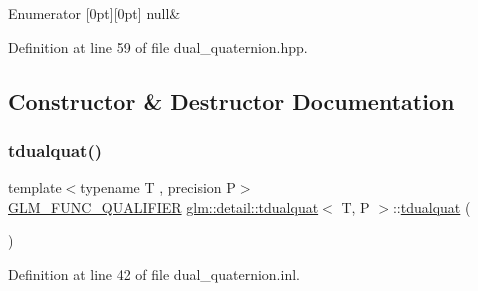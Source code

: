 \begin{DoxyEnumFields}{Enumerator}
[0pt][0pt]{}\mbox{\label{structglm_1_1detail_1_1tdualquat_ace336aab392c50d450452edacc3d7f41a9649d51893e82ea43ff08e3c5f06bdc9}} 
null&\\
\hline

\end{DoxyEnumFields}


Definition at line 59 of file dual\+\_\+quaternion.\+hpp.



\subsection{Constructor \& Destructor Documentation}
\mbox{\label{structglm_1_1detail_1_1tdualquat_ae52f08077fef0b65daffd98e128f3d18}} 
\subsubsection{\texorpdfstring{tdualquat()}{tdualquat()}\hspace{0.1cm}{\footnotesize\ttfamily [1/6]}}
{\footnotesize\ttfamily template$<$typename T , precision P$>$ \\
\hyperlink{setup_8hpp_a33fdea6f91c5f834105f7415e2a64407}{G\+L\+M\+\_\+\+F\+U\+N\+C\+\_\+\+Q\+U\+A\+L\+I\+F\+I\+ER} \hyperlink{structglm_1_1detail_1_1tdualquat}{glm\+::detail\+::tdualquat}$<$ T, P $>$\+::\hyperlink{structglm_1_1detail_1_1tdualquat}{tdualquat} (\begin{DoxyParamCaption}{ }\end{DoxyParamCaption})}



Definition at line 42 of file dual\+\_\+quaternion.\+inl.

\mbox{\label{structglm_1_1detail_1_1tdualquat_a4a3b8676710dc0dd69e03b7e5fa2fd46}} 
